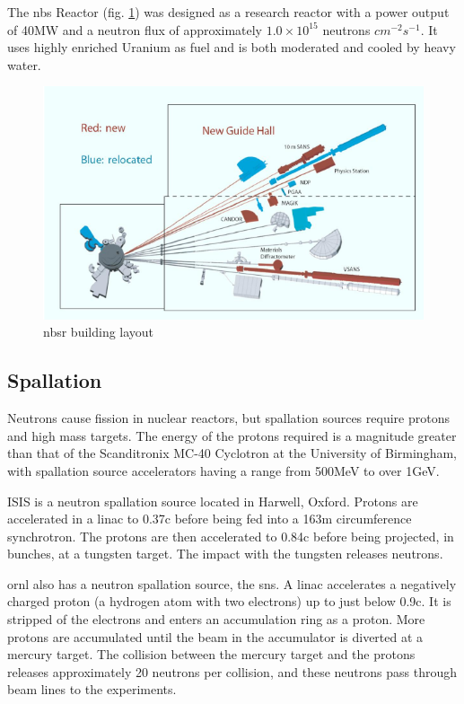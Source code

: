 The \acrlong{nbs} Reactor (fig. \ref{fig:nbsrbeamlines}) was designed as a research reactor with a power output of 40MW and a neutron flux of approximately $1.0 \times 10^{15}$ neutrons $cm^{-2} s^{-1}$.  It uses highly enriched Uranium as fuel and is both moderated and cooled by heavy water. 

\begin{figure}
\begin{center}
\includegraphics[width=.70\linewidth]{chapters/isotope_activation_and_radioactive_decay/images/nbsr.png}
\caption{\acrshort{nbsr} building layout\cite{nbsrhistory}}
\label{fig:nbsrbeamlines}
\end{center}
\end{figure}




\FloatBarrier
\subsection{Spallation}

Neutrons cause fission in nuclear reactors, but spallation sources require protons and high mass targets.  The energy of the protons required is a magnitude greater than that of the Scanditronix MC-40 Cyclotron at the University of Birmingham, with spallation source accelerators having a range from 500MeV to over 1GeV.  

ISIS is a neutron spallation source located in Harwell, Oxford.  Protons are accelerated in a \acrshort{linac} to 0.37c before being fed into a 163m circumference synchrotron.  The protons are then accelerated to 0.84c before being projected, in bunches, at a tungsten target.  The impact with the tungsten releases neutrons\cite{isisneutronsource}.

\acrlong{ornl} also has a neutron spallation source, the \acrshort{sns}.  A \acrshort{linac} accelerates a negatively charged proton (a hydrogen atom with two electrons) up to just below 0.9c.  It is stripped of the electrons and enters an accumulation ring as a proton.  More protons are accumulated until the beam in the accumulator is diverted at a mercury target.  The collision between the mercury target and the protons releases approximately 20 neutrons per collision, and these neutrons pass through beam lines to the experiments. 

